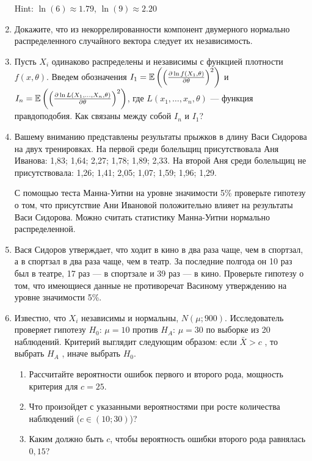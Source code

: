 \documentclass[12pt, a4paper]{article}\usepackage[]{graphicx}\usepackage[]{color}
\begin{document}
\begin{enumerate}
					Hint: $\ln(6)\approx 1.79$, $\ln(9)\approx 2.20$


					\item Докажите, что из некоррелированности компонент двумерного нормально распределенного случайного вектора следует их независимость.

					\item Пусть $X_i$ одинаково распределены и независимы с функцией плотности $f(x,\theta)$. Введем обозначения $I_1=\mathbb{E}\left(\left(\frac{\partial \ln f(X_1,\theta)}{\partial\theta}\right)^2\right)$ и $I_n=\mathbb{E}\left(\left(\frac{\partial \ln L(X_1,\ldots,X_n,\theta)}{\partial \theta}\right)^2\right)$, где $L(x_1,\ldots, x_n,\theta)$ — функция правдоподобия. Как связаны между собой $I_n$ и $I_1$?

					\item Вашему вниманию представлены результаты прыжков в длину
					Васи Сидорова на двух тренировках. На первой среди болельщиц
					присутствовала Аня Иванова: 1,83; 1,64; 2,27;
					1,78; 1,89; 2,33. На второй Аня среди болельщиц не
					присутствовала: 1,26; 1,41; 2,05; 1,07; 1,59; 1,96; 1,29.

					С помощью теста Манна-Уитни на уровне значимости 5\% проверьте гипотезу о
					том, что присутствие Ани Ивановой положительно влияет на
					результаты Васи Сидорова. Можно считать статистику Манна-Уитни нормально распределенной.


					\item Вася Сидоров утверждает, что ходит в кино в два раза чаще, чем в
					спортзал, а в спортзал в два раза чаще, чем в театр. За последние
					полгода он 10 раз был в театре, 17 раз — в спортзале и
					39 раз — в кино. Проверьте гипотезу о том, что имеющиеся данные не противоречат Васиному утверждению на уровне значимости 5\%.


					\item  Известно, что  $X_{i}$ независимы и нормальны, $N\left(\mu ;900\right)$.
					Исследователь проверяет гипотезу $H_{0}$: $\mu =10$  против
					$H_{A}$: $\mu =30$  по выборке из 20 наблюдений. Критерий выглядит
					следующим образом: если  $\bar{X}>c$ , то выбрать  $H_{A} $ ,
					иначе выбрать  $H_{0} $.
					\begin{enumerate}
						\item  Рассчитайте вероятности ошибок
						первого и второго рода, мощность критерия для $c=25$.
						\item Что произойдет с указанными вероятностями при росте количества
						наблюдений ($c\in(10;30)$)?
						\item Каким должно быть $c$, чтобы вероятность ошибки второго рода
						равнялась $0,15$?
					\end{enumerate}





\end{enumerate}
\end{document}
